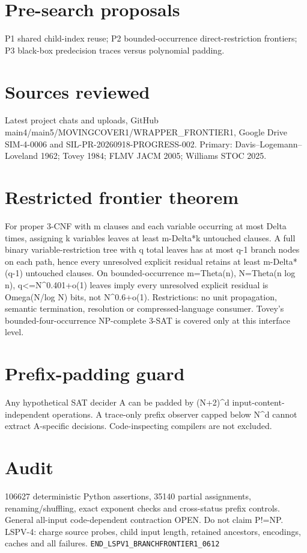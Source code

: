 \section*{Pre-search proposals}
P1 shared child-index reuse; P2 bounded-occurrence direct-restriction frontiers; P3 black-box predecision traces versus polynomial padding.
\section*{Sources reviewed}
Latest project chats and uploads, GitHub main4/main5/MOVINGCOVER1/WRAPPER_FRONTIER1, Google Drive SIM-4-0006 and SIL-PR-20260918-PROGRESS-002. Primary: Davis--Logemann--Loveland 1962; Tovey 1984; FLMV JACM 2005; Williams STOC 2025.
\section*{Restricted frontier theorem}
For proper 3-CNF with m clauses and each variable occurring at most Delta times, assigning k variables leaves at least m-Delta*k untouched clauses. A full binary variable-restriction tree with q total leaves has at most q-1 branch nodes on each path, hence every unresolved explicit residual retains at least m-Delta*(q-1) untouched clauses. On bounded-occurrence m=Theta(n), N=Theta(n log n), q<=N^{0.401+o(1)} leaves imply every unresolved explicit residual is Omega(N/log N) bits, not N^{0.6+o(1)}. Restrictions: no unit propagation, semantic termination, resolution or compressed-language consumer. Tovey's bounded-four-occurrence NP-complete 3-SAT is covered only at this interface level.
\section*{Prefix-padding guard}
Any hypothetical SAT decider A can be padded by (N+2)^d input-content-independent operations. A trace-only prefix observer capped below N^d cannot extract A-specific decisions. Code-inspecting compilers are not excluded.
\section*{Audit}
106627 deterministic Python assertions, 35140 partial assignments, renaming/shuffling, exact exponent checks and cross-status prefix controls. General all-input code-dependent contraction OPEN. Do not claim P!=NP. LSPV-4: charge source probes, child input length, retained ancestors, encodings, caches and all failures.
\texttt{END_LSPV1_BRANCHFRONTIER1_0612}
